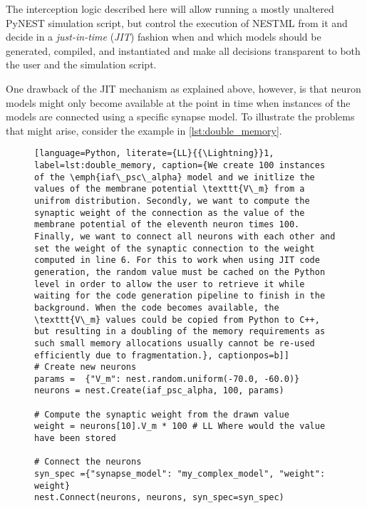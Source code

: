 The interception logic described here will allow running a mostly unaltered PyNEST simulation script, but control the execution of NESTML from it and decide in a \emph{just-in-time} (\emph{JIT}) fashion when and which models should be generated, compiled, and instantiated and make all decisions transparent to both the user and the simulation script.

One drawback of the JIT mechanism as explained above, however, is that neuron models might only become available at the point in time when instances of the models are connected using a specific synapse model. To illustrate the problems that might arise, consider the example in \autoref{lst:double_memory}.

\begin{figure}[ht!]
  \centering
\begin{lstlisting}[language=Python, literate={LL}{{\Lightning}}1, label=lst:double_memory, caption={We create 100 instances of the \emph{iaf\_psc\_alpha} model and we initlize the values of the membrane potential \texttt{V\_m} from a unifrom distribution. Secondly, we want to compute the synaptic weight of the connection as the value of the membrane potential of the eleventh neuron times 100. Finally, we want to connect all neurons with each other and set the weight of the synaptic connection to the weight computed in line 6. For this to work when using JIT code generation, the random value must be cached on the Python level in order to allow the user to retrieve it while waiting for the code generation pipeline to finish in the background. When the code becomes available, the \texttt{V\_m} values could be copied from Python to C++, but resulting in a doubling of the memory requirements as such small memory allocations usually cannot be re-used efficiently due to fragmentation.}, captionpos=b]]
# Create new neurons
params =  {"V_m": nest.random.uniform(-70.0, -60.0)}
neurons = nest.Create(iaf_psc_alpha, 100, params)

# Compute the synaptic weight from the drawn value
weight = neurons[10].V_m * 100 # LL Where would the value have been stored

# Connect the neurons
syn_spec ={"synapse_model": "my_complex_model", "weight": weight}
nest.Connect(neurons, neurons, syn_spec=syn_spec)
\end{lstlisting}
\end{figure}


